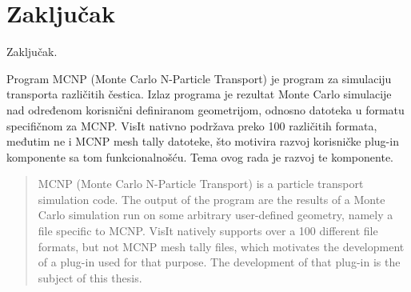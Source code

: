 \documentclass[times, utf8, zavrsni]{fer}
\begin{document}
\chapter{Zaključak}
Zaključak.




\begin{sazetak}
Program MCNP (Monte Carlo N-Particle Transport) je program za simulaciju transporta različitih čestica.
Izlaz programa je rezultat Monte Carlo simulacije nad određenom korisnični definiranom geometrijom, odnosno datoteka u formatu specifičnom za MCNP.
VisIt nativno podržava preko 100 različitih formata, međutim ne i MCNP mesh tally datoteke, što motivira razvoj korisničke plug-in komponente sa tom funkcionalnošću.
Tema ovog rada je razvoj te komponente.

\end{sazetak}

\begin{abstract}
MCNP (Monte Carlo N-Particle Transport) is a particle transport simulation code.
The output of the program are the results of a Monte Carlo simulation run on some arbitrary user-defined geometry, namely a file specific to MCNP.
VisIt natively supports over a 100 different file formats, but not MCNP mesh tally files, which motivates the development of a plug-in used for that purpose.
The development of that plug-in is the subject of this thesis. 

\end{abstract}
\end{document}
